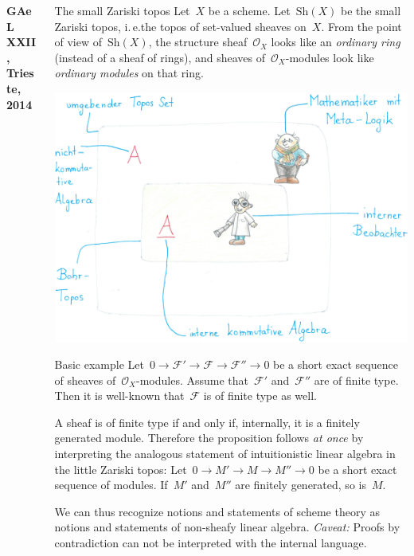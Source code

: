 \documentclass[table]{beamer}
\newcommand{\F}{\mathcal{F}}
\renewcommand{\O}{\mathcal{O}}
\newcommand{\Sh}{\mathrm{Sh}}
\begin{document}
\begin{frame}[t]
\begin{columns}[t]
\begin{column}{0.3\textwidth}
  \vspace{3cm}
  \textbf{GAeL XXII, Trieste, 2014}
\end{column}

\begin{column}{0.3\textwidth}
  \begin{block}{The small Zariski topos}
    Let~$X$ be a scheme. Let~$\Sh(X)$ be the small Zariski topos, i.\,e.\@ the
    topos of set-valued sheaves on~$X$. From the point of view of~$\Sh(X)$,
    the structure sheaf~$\O_X$ looks like an \emph{ordinary ring} (instead of a
    sheaf of rings), and sheaves of~$\O_X$-modules look like \emph{ordinary
    modules} on that ring.\bigskip

    \includegraphics[width=\columnwidth]{bohr-topos}
  \end{block}
  \bigskip

  \begin{block}{Basic example}
    Let~$0 \to \F' \to \F \to \F'' \to 0$ be a short exact sequence of sheaves
    of~$\O_X$-modules. Assume that~$\F'$ and~$\F''$ are of finite type. Then it is
    well-known that~$\F$ is of finite type as well.\medskip

    A sheaf is of finite type if and only if, internally, it is a
    finitely generated module. Therefore the proposition follows \emph{at once}
    by interpreting the analogous statement of intuitionistic linear algebra
    in the little Zariski topos:
    Let~$0 \to M' \to M \to M'' \to 0$ be a short exact sequence of modules.
    If~$M'$ and~$M''$ are finitely generated, so is~$M$.\medskip

    We can thus recognize notions and statements of scheme theory as notions and
    statements of non-sheafy linear algebra.
    \emph{Caveat:} Proofs by contradiction can not be interpreted with the
    internal language.
  \end{block}
\end{column}


\end{columns}
\end{frame}
\end{document}
